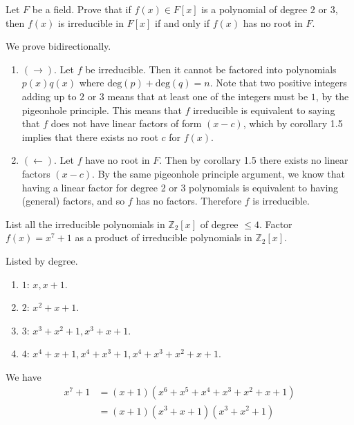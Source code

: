   \begin{exercise}[Shifrin 3.1.8]
    Let $F$ be a field. Prove that if $f(x) \in F[x]$ is a polynomial of degree $2$ or $3$, then $f(x)$ is irreducible in $F[x]$ if and only if $f(x)$ has no root in $F$.
  \end{exercise}
  \begin{solution}
    We prove bidirectionally. 
    \begin{enumerate}
      \item $(\rightarrow)$. Let $f$ be irreducible. Then it cannot be factored into polynomials $p(x) q(x)$ where $\mathrm{deg}(p) + \mathrm{deg}(q) = n$. Note that two positive integers adding up to $2$ or $3$ means that at least one of the integers must be $1$, by the pigeonhole principle. This means that $f$ irreducible is equivalent to saying that $f$ does not have linear factors of form $(x-c)$, which by corollary 1.5 implies that there exists no root $c$ for $f(x)$. 
      \item $(\leftarrow)$. Let $f$ have no root in $F$. Then by corollary 1.5 there exists no linear factors $(x-c)$. By the same pigeonhole principle argument, we know that having a linear factor for degree 2 or 3 polynomials is equivalent to having (general) factors, and so $f$ has no factors. Therefore $f$ is irreducible. 
    \end{enumerate}
  \end{solution}

  \begin{exercise}[Shifrin 3.1.13]
    List all the irreducible polynomials in $\mathbb{Z}_2[x]$ of degree $\leq 4$. Factor $f(x) = x^7 + 1$ as a product of irreducible polynomials in $\mathbb{Z}_2[x]$.
  \end{exercise}
  \begin{solution}
    Listed by degree. 
    \begin{enumerate}
      \item $1$: $x, x + 1$. 
      \item $2$: $x^2 + x + 1$. 
      \item $3$: $x^3 + x^2 + 1, x^3 + x + 1$. 
      \item $4$: $x^4 + x + 1, x^4 + x^3 + 1, x^4 + x^3 + x^2 + x + 1$. 
    \end{enumerate}
    We have 
    \begin{align}
      x^7 + 1 & = (x + 1)(x^6 + x^5 + x^4 + x^3 + x^2 + x + 1) \\
              & = (x + 1) (x^3 + x + 1) (x^3 + x^2 + 1)
    \end{align}
  \end{solution}


